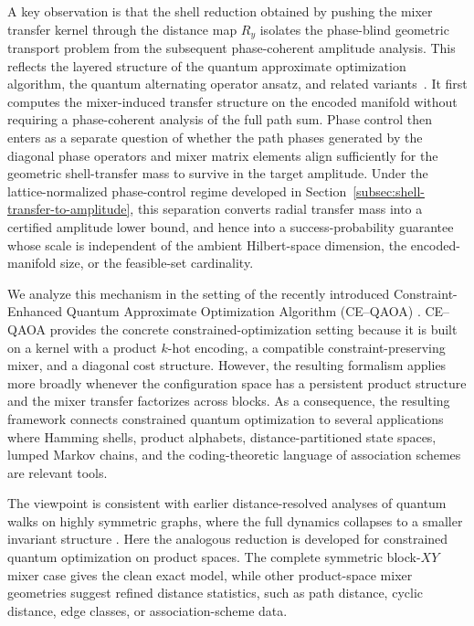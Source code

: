 \documentclass[a4paper,onecolumn,11pt,unpublished]{quantumarticle}
\theoremstyle{remark}
\begin{document}
A key observation is that the shell reduction obtained by pushing the mixer
transfer kernel through the distance map \(R_y\) isolates the phase-blind
geometric transport problem from the subsequent phase-coherent amplitude
analysis. This reflects the layered structure of the quantum approximate
optimization algorithm, the quantum alternating operator ansatz, and related
variants~\cite{Farhi2014QAOA,Hadfield2019AOA}. It first computes the mixer-induced transfer structure on the encoded manifold without requiring a phase-coherent analysis of the full path sum. Phase control then enters as a separate question of whether the path phases generated by the diagonal phase operators and mixer matrix elements align sufficiently for the geometric shell-transfer mass to survive in the target amplitude. Under the lattice-normalized phase-control regime developed in Section~\ref{subsec:shell-transfer-to-amplitude}, this separation converts radial transfer mass into a certified amplitude lower bound, and hence into a success-probability guarantee whose scale is independent of the ambient Hilbert-space dimension, the encoded-manifold size, or the feasible-set cardinality.


We analyze this mechanism in the setting of the recently introduced Constraint-Enhanced Quantum Approximate Optimization Algorithm (CE--QAOA)
\cite{onahce}. CE--QAOA provides the concrete constrained-optimization setting because it is built on a kernel with a product \(k\)-hot encoding, a compatible constraint-preserving mixer, and a diagonal cost structure. However, the resulting formalism applies more broadly whenever the configuration space has a persistent product structure and the mixer transfer factorizes across blocks. As a consequence, the resulting framework connects constrained quantum optimization to several applications where Hamming shells, product alphabets, distance-partitioned state spaces, lumped Markov chains, and the coding-theoretic language of association schemes \cite{MacWilliamsSloane1977,DelsarteLevenshtein1998} are relevant tools.


The viewpoint is consistent with earlier distance-resolved analyses of quantum walks on highly symmetric graphs, where the full dynamics collapses to a smaller invariant structure \cite{MooreRussell2002,Childs2004SpatialSearch,Childs2008WalkCorrespondence,KroviBrun2007Quotient}. Here the analogous reduction is developed for constrained quantum optimization on product spaces. The complete symmetric block-\(XY\) 
mixer case gives the clean exact model,
while other product-space mixer geometries suggest refined distance statistics, such as path distance, cyclic distance, edge classes, or association-scheme data.
\end{document}
